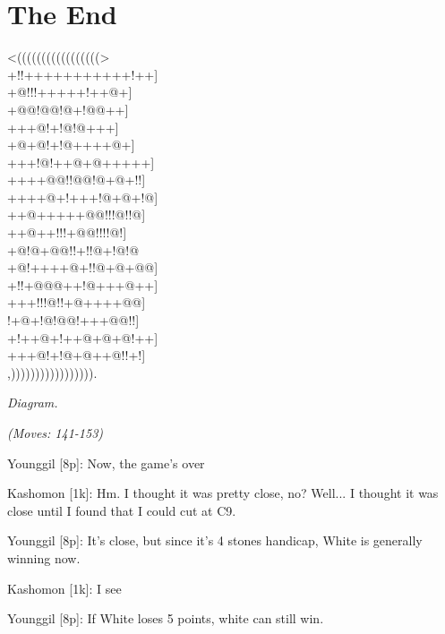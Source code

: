 \documentclass[letterpaper,12pt]{memoir}
\newcounter{GoFigure}[part]
\newcommand{\gofigure}{%
 \stepcounter{GoFigure}
 \centerline{\textit{Diagram.\thinspace\arabic{GoFigure}}}
}
\newcommand{\subtext}[1]{\centerline{\textit{#1}}}
\begin{document}
\chapter{The End}
{\centering
{}
{\gnos
<(((((((((((((((((>\\
+!!+++++++++++!++]\\
+@!!!+++++!++@+]\\
+@@!@@!@+!@@++]\\
+++@!+!@!@+++]\\
+@+@!+!@++++@+]\\
+++!@!++@+@+++++]\\
++++@@!!@@!@+@+!!]\\
++++@+!+++!@+@+!@]\\
++@+++++@@!!!@!!@]\\
++@++!!!+@@!!!!@!]\\
+@!@+@@!!+!!@+!@!@\\
+@!++++@+!!@+@+@@]\\
+!!+@@@++!@+++@++]\\
+++!!!@!!+@++++@@]\\
!+@+!@!@@!+++@@!!]\\
+!++@+!++@+@+@!++]\\
+++@!+!@+@++@!!+!]\\
,))))))))))))))))).\\
}
}
\gofigure

\subtext{(Moves: 141-153)}

Younggil [8p]: Now, the game's over

Kashomon [1k]: Hm. I thought it was pretty close, no? Well... I thought it was close until I found that I could cut at C9.

Younggil [8p]: It's close, but since it's 4 stones handicap, White is generally winning now.

Kashomon [1k]: I see

Younggil [8p]: If White loses 5 points, white can still win.
\end{document}
